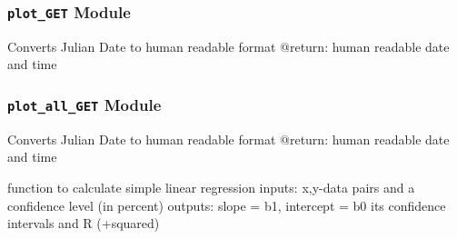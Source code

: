 \documentclass[letterpaper,10pt,english]{sphinxmanual}
\begin{document}
\subsubsection{\texttt{plot\_GET} Module}
\label{SamPy.cos:plot-get-module}\label{SamPy.cos:module-SamPy.cos.plot_GET}

\begin{fulllineitems}
\label{SamPy.cos:SamPy.cos.plot_GET.fromJulian}
Converts Julian Date to human readable format
@return: human readable date and time

\end{fulllineitems}



\subsubsection{\texttt{plot\_all\_GET} Module}
\label{SamPy.cos:plot-all-get-module}\label{SamPy.cos:module-SamPy.cos.plot_all_GET}

\begin{fulllineitems}
\label{SamPy.cos:SamPy.cos.plot_all_GET.findDifferentRatios}
\end{fulllineitems}



\begin{fulllineitems}
\label{SamPy.cos:SamPy.cos.plot_all_GET.fromJulian}
Converts Julian Date to human readable format
@return: human readable date and time

\end{fulllineitems}



\begin{fulllineitems}
\label{SamPy.cos:SamPy.cos.plot_all_GET.mylinearregression}
function to calculate simple linear regression
inputs: x,y-data pairs and a confidence level (in percent)
outputs: slope = b1, intercept = b0 its confidence intervals
and R (+squared)

\end{fulllineitems}
\end{document}
